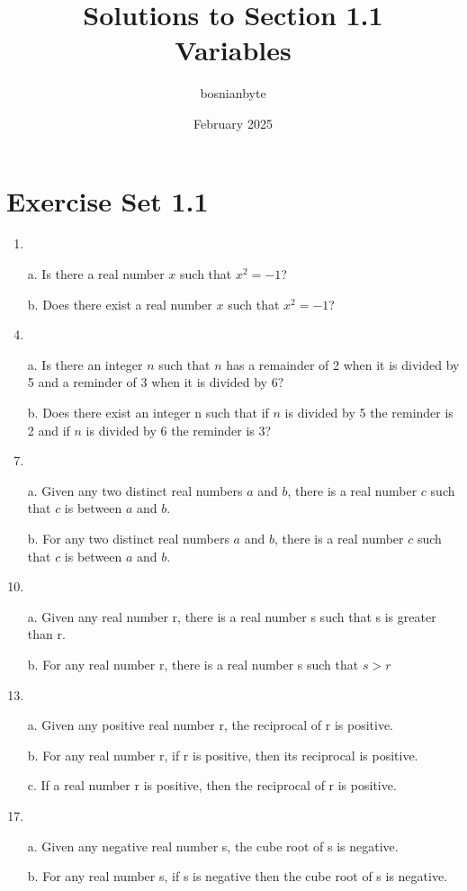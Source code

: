 \documentclass{article}
\title{Solutions to Section 1.1 \\ Variables}
\author{bosnianbyte}
\date{February 2025}
\begin{document}
\maketitle

\section{Exercise Set 1.1}

\begin{enumerate}[label=\textbf{\arabic*.}]
\item %
\item[a.] Is there a real number $x$ such that $x^2 = -1$?
\item[b.] Does there exist a real number $x$ such that $x^2 = -1$? 
\item %
\item[a.] Is there an integer $n$ such that $n$ has a remainder of 2 when it is divided by 5 and a reminder of 3 when it is divided by 6?
\item[b.] Does there exist an integer n such that if $n$ is divided by 5 the reminder is 2 and if $n$ is divided by 6 the reminder is 3?
\item %
\item[a.] Given any two distinct real numbers $a$ and $b$, there is a real number $c$ such that $c$ is between $a$ and $b$.
\item[b.] For any two distinct real numbers $a$ and $b$, there is a real number $c$ such that $c$ is between $a$ and $b$.
\item %
\item[a.] Given any real number r, there is a real number s such that s is greater than r.
\item[b.] For any real number r, there is a real number s such that $s > r$
\item %
\item[a.] Given any positive real number r, the reciprocal of r is positive.
\item[b.] For any real number r, if r is positive, then its reciprocal is positive.
\item[c.] If a real number r is positive, then the reciprocal of r is positive.
\item %
\item[a.] Given any negative real number s, the cube root of s is negative.
\item[b.] For any real number s, if s is negative then the cube root of s is negative.

\end{enumerate}
\end{document}

